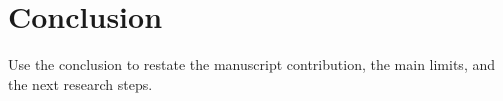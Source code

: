 \chapter*{Conclusion}

Use the conclusion to restate the manuscript contribution, the main limits, and the next research steps.
